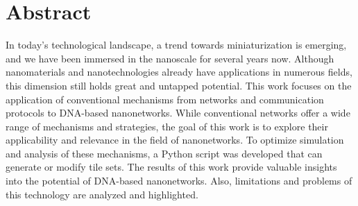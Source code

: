 %
\vskip 3cm
%

\section*{\huge Abstract}

In today's technological landscape, a trend towards miniaturization is emerging, and we have been immersed in the nanoscale for several years now. Although nanomaterials and nanotechnologies already have applications in numerous fields, this dimension still holds great and untapped potential. This work focuses on the application of conventional mechanisms from networks and communication protocols to DNA-based nanonetworks. While conventional networks offer a wide range of mechanisms and strategies, the goal of this work is to explore their applicability and relevance in the field of nanonetworks. To optimize simulation and analysis of these mechanisms, a Python script was developed that can generate or modify tile sets. The results of this work provide valuable insights into the potential of DNA-based nanonetworks. Also, limitations and problems of this technology are analyzed and highlighted.

\thispagestyle{empty}
\cleardoublepage